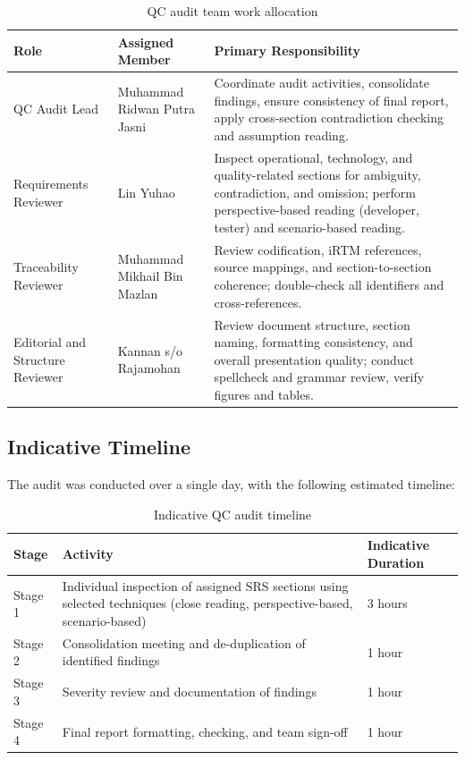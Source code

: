 \documentclass[11pt,a4paper]{article}
\begin{document}
\begin{table}[H]
\centering
\small
\renewcommand{\arraystretch}{1.4}
\begin{tabularx}{\textwidth}{|p{}|p{}|X|}
\hline
\rowcolor{tableheader}
\textbf{Role} & \textbf{Assigned Member} & \textbf{Primary Responsibility} \\
\hline
QC Audit Lead & Muhammad Ridwan Putra Jasni & Coordinate audit activities, consolidate findings, ensure consistency of final report, apply cross-section contradiction checking and assumption reading. \\
\hline
Requirements Reviewer & Lin Yuhao & Inspect operational, technology, and quality-related sections for ambiguity, contradiction, and omission; perform perspective-based reading (developer, tester) and scenario-based reading. \\
\hline
Traceability Reviewer & Muhammad Mikhail Bin Mazlan & Review codification, iRTM references, source mappings, and section-to-section coherence; double-check all identifiers and cross-references. \\
\hline
Editorial and Structure Reviewer & Kannan s/o Rajamohan & Review document structure, section naming, formatting consistency, and overall presentation quality; conduct spellcheck and grammar review, verify figures and tables. \\
\hline
\end{tabularx}
\caption{QC audit team work allocation}
\label{tab:qc-wbs}
\end{table}

\subsection{Indicative Timeline}
The audit was conducted over a single day, with the following estimated timeline:

\begin{table}[H]
\centering
\small
\renewcommand{\arraystretch}{1.4}
\begin{tabularx}{\textwidth}{|p{}|p{}|X|}
\hline
\rowcolor{tableheader}
\textbf{Stage} & \textbf{Activity} & \textbf{Indicative Duration} \\
\hline
Stage 1 & Individual inspection of assigned SRS sections using selected techniques (close reading, perspective-based, scenario-based) & 3 hours \\
\hline
Stage 2 & Consolidation meeting and de-duplication of identified findings & 1 hour \\
\hline
Stage 3 & Severity review and documentation of findings & 1 hour \\
\hline
Stage 4 & Final report formatting, checking, and team sign-off & 1 hour \\
\hline
\end{tabularx}
\caption{Indicative QC audit timeline}
\label{tab:qc-timeline}
\end{table}
\end{document}
